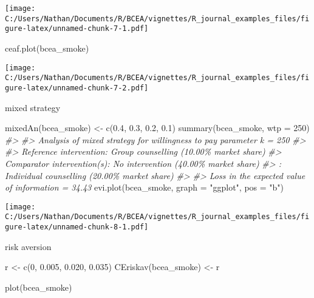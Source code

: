 \documentclass[
]{article}
\newenvironment{Shaded}{\begin{snugshade}}{\end{snugshade}}
\newcommand{\AttributeTok}[1]{\textcolor[rgb]{0.77,0.63,0.00}{#1}}
\newcommand{\CommentTok}[1]{\textcolor[rgb]{0.56,0.35,0.01}{\textit{#1}}}
\newcommand{\DecValTok}[1]{\textcolor[rgb]{0.00,0.00,0.81}{#1}}
\newcommand{\FloatTok}[1]{\textcolor[rgb]{0.00,0.00,0.81}{#1}}
\newcommand{\FunctionTok}[1]{\textcolor[rgb]{0.00,0.00,0.00}{#1}}
\newcommand{\NormalTok}[1]{#1}
\newcommand{\OtherTok}[1]{\textcolor[rgb]{0.56,0.35,0.01}{#1}}
\newcommand{\StringTok}[1]{\textcolor[rgb]{0.31,0.60,0.02}{#1}}
\begin{document}
\texttt{[image: C:/Users/Nathan/Documents/R/BCEA/vignettes/R\_journal\_examples\_files/figure-latex/unnamed-chunk-7-1.pdf]}

\begin{Shaded}
\begin{Highlighting}[]
\FunctionTok{ceaf.plot}\NormalTok{(bcea\_smoke)}
\end{Highlighting}
\end{Shaded}

\texttt{[image: C:/Users/Nathan/Documents/R/BCEA/vignettes/R\_journal\_examples\_files/figure-latex/unnamed-chunk-7-2.pdf]}

mixed strategy

\begin{Shaded}
\begin{Highlighting}[]
\FunctionTok{mixedAn}\NormalTok{(bcea\_smoke) }\OtherTok{\textless{}{-}} \FunctionTok{c}\NormalTok{(}\FloatTok{0.4}\NormalTok{, }\FloatTok{0.3}\NormalTok{, }\FloatTok{0.2}\NormalTok{, }\FloatTok{0.1}\NormalTok{)}
\FunctionTok{summary}\NormalTok{(bcea\_smoke, }\AttributeTok{wtp =} \DecValTok{250}\NormalTok{)}
\CommentTok{\#\textgreater{} }
\CommentTok{\#\textgreater{} Analysis of mixed strategy for willingness to pay parameter k = 250}
\CommentTok{\#\textgreater{} }
\CommentTok{\#\textgreater{} Reference intervention: Group counselling (10.00\% market share)}
\CommentTok{\#\textgreater{} Comparator intervention(s): No intervention (40.00\% market share)}
\CommentTok{\#\textgreater{}                           : Individual counselling (20.00\% market share)}
\CommentTok{\#\textgreater{} }
\CommentTok{\#\textgreater{} Loss in the expected value of information = 34.43}
\FunctionTok{evi.plot}\NormalTok{(bcea\_smoke, }\AttributeTok{graph =} \StringTok{"ggplot"}\NormalTok{, }\AttributeTok{pos =} \StringTok{"b"}\NormalTok{)}
\end{Highlighting}
\end{Shaded}

\texttt{[image: C:/Users/Nathan/Documents/R/BCEA/vignettes/R\_journal\_examples\_files/figure-latex/unnamed-chunk-8-1.pdf]}

risk aversion

\begin{Shaded}
\begin{Highlighting}[]
\NormalTok{r }\OtherTok{\textless{}{-}} \FunctionTok{c}\NormalTok{(}\DecValTok{0}\NormalTok{, }\FloatTok{0.005}\NormalTok{, }\FloatTok{0.020}\NormalTok{, }\FloatTok{0.035}\NormalTok{)}
\FunctionTok{CEriskav}\NormalTok{(bcea\_smoke) }\OtherTok{\textless{}{-}}\NormalTok{ r}

\FunctionTok{plot}\NormalTok{(bcea\_smoke)}
\end{Highlighting}
\end{Shaded}
\end{document}
